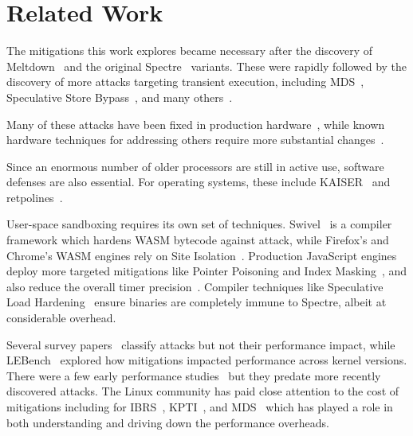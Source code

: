 \section{Related Work}
\label{s:related}

The mitigations this work explores became necessary after the discovery of Meltdown~\cite{lipp:meltdown} and the original Spectre~\cite{kocher:spectre} variants.
These were rapidly followed by the discovery of more attacks targeting transient execution, including MDS~\cite{canella:fallout,schwarz:zombieload,schaik:ridl}, Speculative Store Bypass~\cite{horn:speculative-store-bypass}, and many others~\cite{bhattacharyya:smotherspectre,bulck:foreshadow,chen:sgxspectre,koruyeh:spectrersb,ragab:crosstalk,stecklina:lazyfp,schaik:cacheout,weisse:foreshadow-ng, bulck:lvi}.


Many of these attacks have been fixed in production hardware~\cite{intel:affected-processors}, while known hardware techniques for addressing others require more substantial changes~\cite{ainsworth:muontrap,yu:stt,yu:sdo}.

Since an enormous number of older processors are still in active use, software defenses are also essential.
For operating systems, these include KAISER~\cite{gruss:kaiser} and retpolines~\cite{intel:retpoline}.

User-space sandboxing requires its own set of techniques.
Swivel~\cite{narayan:swivel} is a compiler framework which hardens WASM bytecode against attack, while
Firefox's and Chrome's WASM engines rely on Site Isolation~\cite{reis:site-isolation}.
Production JavaScript engines deploy more targeted mitigations like Pointer Poisoning and Index Masking~\cite{webkit:spectre-meltdown}, and also reduce the overall timer precision~\cite{mozilla:timer-precision, webkit:spectre-meltdown}.
Compiler techniques like Speculative Load Hardening~\cite{carruth:slh} ensure binaries are completely immune to Spectre, albeit at considerable overhead.

Several survey papers~\cite{hill:survey,sok:transient,xiong:survey} classify attacks but not their performance impact, while LEBench~\cite{ren:lebench} explored how mitigations impacted performance across kernel versions.
There were a few early performance studies~\cite{nikolay:meltdown-spectre-performance,prout:measuring-spectre-meltdown} but they predate more recently discovered attacks.
The Linux community has paid close attention to the cost of mitigations including for IBRS~\cite{linus:ibrs-rant},  KPTI~\cite{gregg:kpti-perfromance}, and MDS~\cite{larabel:perf-zombieload} which has played a role in both understanding and driving down the performance overheads.

